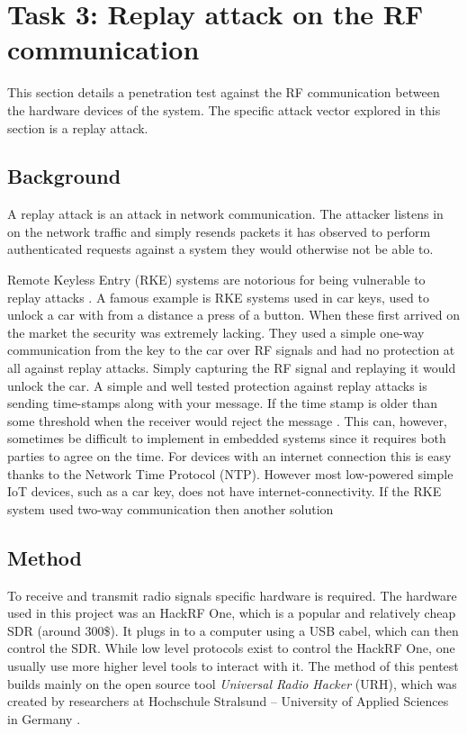 \section{Task 3: Replay attack on the RF communication} \label{ch:pentesting:replay}
This section details a penetration test against the RF communication between the hardware devices of the system. The specific attack vector explored in this section is a replay attack.

\subsection{Background}
A replay attack is an attack in network communication. The attacker listens in on the network traffic and simply resends packets it has observed to perform authenticated requests against a system they would otherwise not be able to.

Remote Keyless Entry (RKE) systems are notorious for being vulnerable to replay attacks \cite{rke-replay}. A famous example is RKE systems used in car keys, used to unlock a car with from a distance a press of a button. When these first arrived on the market the security was extremely lacking. They used a simple one-way communication from the key to the car over RF signals and had no protection at all against replay attacks. Simply capturing the RF signal and replaying it would unlock the car. A simple and well tested protection against replay attacks is sending time-stamps along with your message. If the time stamp is older than some threshold when the receiver would reject the message \cite{rke-replay}. This can, however, sometimes be difficult to implement in embedded systems since it requires both parties to agree on the time. For devices with an internet connection this is easy thanks to the Network Time Protocol (NTP). However most low-powered simple IoT devices, such as a car key, does not have internet-connectivity. If the RKE system used two-way communication then another solution 

\subsection{Method}
To receive and transmit radio signals specific hardware is required. The hardware used in this project was an HackRF One, which is a popular and relatively cheap \gls{SDR} (around 300\$). It plugs in to a computer using a USB cabel, which can then control the SDR. While low level protocols exist to control the HackRF One, one usually use more higher level tools to interact with it. The method of this pentest builds mainly on the open source tool \textit{Universal Radio Hacker} (URH), which was created by researchers at Hochschule Stralsund – University of Applied Sciences in Germany \cite{urh}. 

